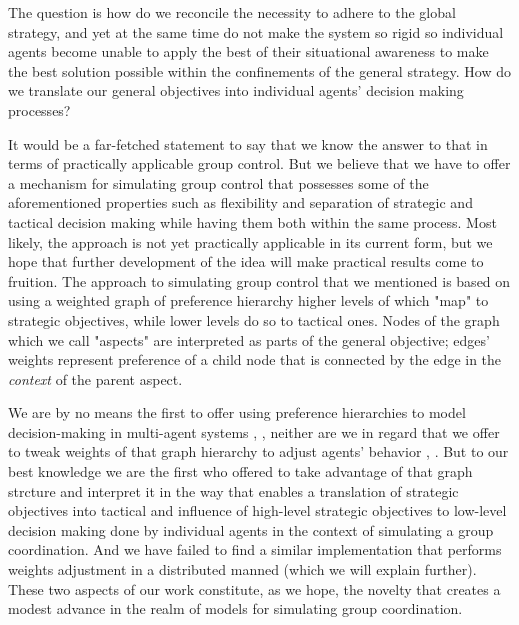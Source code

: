 The question is how do we reconcile the necessity to adhere to the global strategy, and yet at the same time do not make
the system so rigid so individual agents become unable to apply the best of their situational awareness to make the best
solution possible within the confinements of the general strategy. How do we translate our general objectives into
individual agents' decision making processes?


It would be a far-fetched statement to say that we know the answer to that in terms of practically applicable group control. But we believe that we have to offer a mechanism for simulating group control that possesses some of the aforementioned properties such as flexibility and separation of strategic and tactical decision making while having them both within the same process. Most likely, the approach is not yet practically applicable in its current form, but we hope that further development of the idea will make practical results come to fruition.  The approach to simulating group control that we mentioned is based on using a weighted graph of preference hierarchy higher levels of which "map" to strategic objectives, while lower levels do so to tactical ones. Nodes of the graph which we call "aspects" are interpreted as parts of the general objective; edges' weights represent preference of a child node that is connected by the edge in the \textit{context} of the parent aspect.

We are by no means the first to offer using preference hierarchies to model decision-making in multi-agent systems
\cite{cartvehishvili-2018-model}, \cite{drakaki-2018-intelligent}, neither are we in regard that we offer to tweak
weights of that graph hierarchy to adjust agents' behavior \cite{zytniewski-2016-application},
\cite{brintrup-2010-behaviour}. But to our best knowledge we are the first who offered to take advantage of that graph
strcture and interpret it in the way that enables a translation of strategic objectives into tactical and influence of
high-level strategic objectives to low-level decision making done by individual agents in the context of simulating a
group coordination. And we have failed to find a similar implementation that performs weights adjustment in a
distributed manned (which we will explain further). These two aspects of our work constitute, as we hope, the novelty
that creates a modest advance in the realm of models for simulating group coordination.

